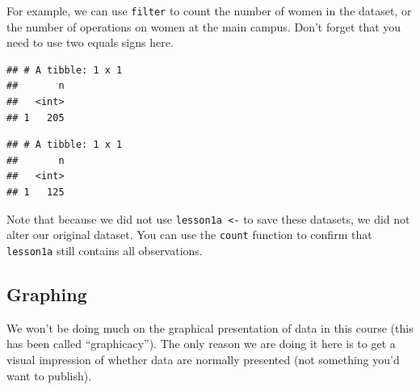 \documentclass[]{book}
\newenvironment{Shaded}{\begin{snugshade}}{\end{snugshade}}
\newcommand{\CommentTok}[1]{\textcolor[rgb]{0.56,0.35,0.01}{\textit{#1}}}
\newcommand{\DecValTok}[1]{\textcolor[rgb]{0.00,0.00,0.81}{#1}}
\newcommand{\KeywordTok}[1]{\textcolor[rgb]{0.13,0.29,0.53}{\textbf{#1}}}
\newcommand{\NormalTok}[1]{#1}
\newcommand{\OperatorTok}[1]{\textcolor[rgb]{0.81,0.36,0.00}{\textbf{#1}}}
\newcommand{\StringTok}[1]{\textcolor[rgb]{0.31,0.60,0.02}{#1}}
\begin{document}
For example, we can use \texttt{filter} to count the number of women in
the dataset, or the number of operations on women at the main campus.
Don't forget that you need to use two equals signs here.

\begin{Shaded}
\end{Shaded}

\begin{verbatim}
## # A tibble: 1 x 1
##       n
##   <int>
## 1   205
\end{verbatim}

\begin{Shaded}
\end{Shaded}

\begin{verbatim}
## # A tibble: 1 x 1
##       n
##   <int>
## 1   125
\end{verbatim}

Note that because we did not use \texttt{lesson1a\ \textless{}-} to save
these datasets, we did not alter our original dataset. You can use the
\texttt{count} function to confirm that \texttt{lesson1a} still contains
all observations.

\hypertarget{graphing}{%
\subsection{Graphing}\label{graphing}}

We won't be doing much on the graphical presentation of data in this
course (this has been called ``graphicacy''). The only reason we are
doing it here is to get a visual impression of whether data are normally
presented (not something you'd want to publish).
\end{document}
